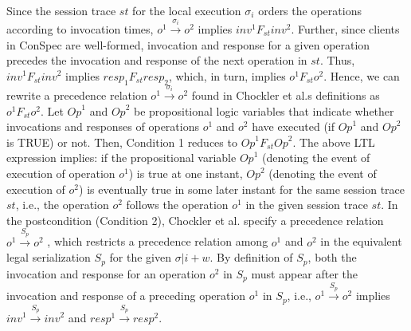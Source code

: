 \documentclass[acmlarge, ,11pt]{acmart}
\begin{document}
  Since the session trace  $\mathit{st}$ for the local execution $\sigma_i$ orders the operations according to invocation times, $ \mathit{o}^1 \xrightarrow{\sigma_i} \mathit{o}^2 $ implies  $\mathit{inv}^1 F_\mathit{st} \mathit{inv}^2$.  Further, since clients in ConSpec are well-formed, invocation and response for a given operation precedes the invocation and response of the next operation in $\mathit{st}$.  %
  Thus,  $\mathit{inv}^1 F_\mathit{st} \mathit{inv}^2$ implies $ \mathit{resp}_1 F_\mathit{st}  \mathit{resp}_2 $, which, in turn, implies $\mathit{o}^1 F_\mathit{st} \mathit{o}^2$.
 Hence, we can rewrite a precedence relation $ \mathit{o}^1 \xrightarrow{\sigma_i} \mathit{o}^2 $ found in Chockler et al.\textquotesingle s definitions as $\mathit{o}^1 F_\mathit{st} \mathit{o}^2$. %
 Let $\mathit{Op}^1$ and $\mathit{Op}^2$  be propositional logic
  variables that indicate whether invocations and responses of operations $\mathit{o}^1$ and $\mathit{o}^2$  have
  executed (if $\mathit{Op}^1$ and $\mathit{Op}^2$ is TRUE) or not.  Then, Condition 1 reduces to
    $\mathit{Op}^1 F_\mathit{st} \mathit{Op}^2 $. The above LTL expression implies: if the propositional variable
    $\mathit{Op}^1$ (denoting the event of execution of operation $\mathit{o}^1$) is true at one instant, $\mathit{Op}^2$ (denoting the event of execution of $\mathit{o}^2$)  is eventually true in some later instant for the
    same session trace $\mathit{st}$, i.e.,  the operation $\mathit{o}^2$ follows the operation $\mathit{o}^1$ in the
     given session trace $\mathit{st}$.
In the postcondition (Condition 2), Chockler et al.  specify a precedence relation $\mathit{o}^1 \xrightarrow{S_p} \mathit{o}^2$ , which  restricts a precedence relation among $\mathit{o}^1$ and $\mathit{o}^2$ in the equivalent legal serialization ${S_p}$ for the given $\sigma |i + w$.   By definition of $S_p$, both the invocation and response for  an operation $\mathit{o}^2$ in $S_p$ must appear after the invocation and response of a preceding operation $\mathit{o}^1$ in $S_p$, i.e., $ \mathit{o}^1 \xrightarrow{S_p} \mathit{o}^2 $ implies $ \mathit{inv}^1 \xrightarrow{S_p} \mathit{inv}^2 $ and $ \mathit{resp}^1 \xrightarrow{S_p} \mathit{resp}^2 $.
\end{document}
